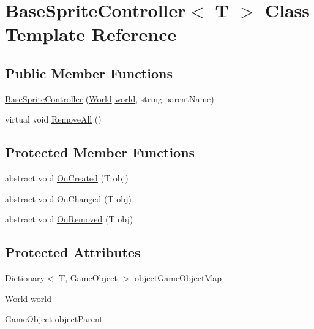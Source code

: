 \hypertarget{class_base_sprite_controller}{}\section{Base\+Sprite\+Controller$<$ T $>$ Class Template Reference}
\label{class_base_sprite_controller}
\subsection*{Public Member Functions}
\begin{DoxyCompactItemize}
\item 
\hyperlink{class_base_sprite_controller_a701521b87247bf26c1a491b86466ab0a}{Base\+Sprite\+Controller} (\hyperlink{class_world}{World} \hyperlink{class_base_sprite_controller_a593ea6a31165eff51a0acffc12ea65ca}{world}, string parent\+Name)
\item 
virtual void \hyperlink{class_base_sprite_controller_ae1fdf8c0abb1e362257540f2de80d6dc}{Remove\+All} ()
\end{DoxyCompactItemize}
\subsection*{Protected Member Functions}
\begin{DoxyCompactItemize}
\item 
abstract void \hyperlink{class_base_sprite_controller_a3fc29069dd8d0c83bbdbcb9cfdc1a483}{On\+Created} (T obj)
\item 
abstract void \hyperlink{class_base_sprite_controller_add80e62058a78ba9869a3603b7b41f32}{On\+Changed} (T obj)
\item 
abstract void \hyperlink{class_base_sprite_controller_aa1a780f4cb283dc19fed30e352d39e06}{On\+Removed} (T obj)
\end{DoxyCompactItemize}
\subsection*{Protected Attributes}
\begin{DoxyCompactItemize}
\item 
Dictionary$<$ T, Game\+Object $>$ \hyperlink{class_base_sprite_controller_a45a85e9a0a75886567d7b987a58a60d9}{object\+Game\+Object\+Map}
\item 
\hyperlink{class_world}{World} \hyperlink{class_base_sprite_controller_a593ea6a31165eff51a0acffc12ea65ca}{world}
\item 
Game\+Object \hyperlink{class_base_sprite_controller_a35a1646a05922049ab4e6c8e56209821}{object\+Parent}
\end{DoxyCompactItemize}


